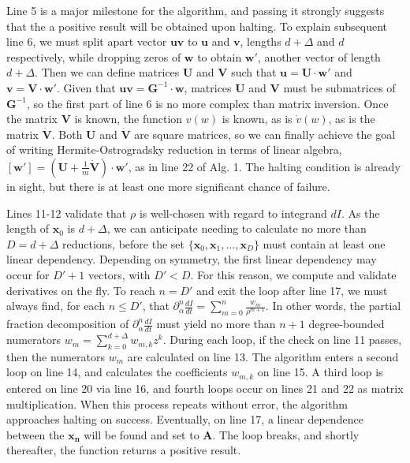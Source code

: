 \documentclass[nofootinbib,preprint]{revtex4-1}
\begin{document}
Line 5 is a major milestone for the algorithm, and passing it strongly suggests that the a positive 
result will be obtained upon halting. To explain subsequent line 6, we must split apart 
vector $\mathbf{uv}$ to $\mathbf{u}$ and $\mathbf{v}$, lengths $d+\Delta$ and $d$ respectively,
while dropping zeros of $\mathbf{w}$ to obtain $\mathbf{w}'$, another vector of length $d+\Delta$. 
Then we can define matrices $\mathbf{U}$ and $\mathbf{V}$ such that $\mathbf{u}=\mathbf{U}\cdot \mathbf{w}'$
and $\mathbf{v}=\mathbf{V}\cdot \mathbf{w}'$. Given that $\mathbf{uv}=\mathbf{G}^{-1}\cdot\mathbf{w}$,
matrices $\mathbf{U}$ and $\mathbf{V}$ must be submatrices of $\mathbf{G}^{-1}$, so the first part 
of line 6 is no more complex than matrix inversion. Once the matrix $\mathbf{V}$ is known, the 
function $v(w)$ is known, as is $\dot{v}(w)$, as is the matrix $\dot{\mathbf{V}}$. Both $\mathbf{U}$
and $\dot{\mathbf{V}}$ are square matrices, so we can finally achieve the goal of writing 
Hermite-Ostrogradsky reduction in terms of linear algebra, 
$[\mathbf{w}']=(\mathbf{U}+\frac{1}{m}\dot{\mathbf{V}})\cdot\mathbf{w}'$,
as in line 22 of Alg. 1.  The halting condition is already in sight, but there is at least 
one more significant chance of failure.


Lines 11-12 validate that $\rho$ is well-chosen with regard to integrand $dI$. As the 
length of $\mathbf{x}_0$ is $d+\Delta$, we can anticipate needing to calculate no more 
than $D=d+\Delta$ reductions, before the set $\{\mathbf{x}_0,\mathbf{x}_1,\ldots,\mathbf{x}_D\}$
must contain at least one linear dependency. Depending on symmetry, the first linear dependency
may occur for $D'+1$ vectors, with $D'<D$. For this reason, we compute and validate derivatives 
on the fly. To reach $n=D'$ and exit the loop after line 17, we must always find, for each $n \le D'$, 
that $\partial_{\alpha}^n\frac{dI}{dt}=\sum_{m=0}^n\frac{w_m}{\rho^{m+1}}$. In other words,
the partial fraction decomposition of $\partial_{\alpha}^n\frac{dI}{dt}$ must yield no more 
than $n+1$ degree-bounded numerators $w_m=\sum_{k=0}^{d+\Delta}w_{m,k}z^k$. During each
loop, if the check on line 11 passes, then the numerators $w_m$ are calculated on line 13. 
The algorithm enters a second loop on line 14, and calculates the coefficients $w_{m,k}$ on 
line 15. A third loop is entered on line 20 via line 16, and fourth loops occur on lines 
21 and 22 as matrix multiplication. When this process repeats without error, the algorithm
approaches halting on success. Eventually, on line 17, a linear dependence between the 
$\mathbf{x_n}$ will be found and set to $\mathbf{A}$. The loop breaks, and shortly 
thereafter, the function returns a positive result. 
\end{document}
